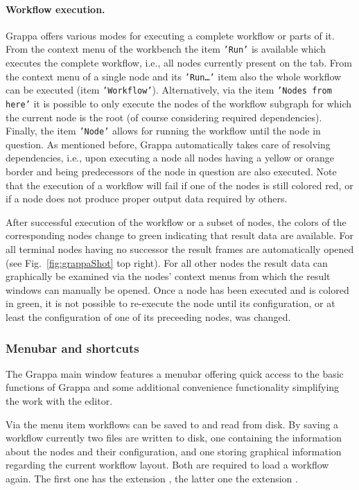 \paragraph{Workflow execution.} Grappa offers various modes for executing a
complete workflow or parts of it.
From the context menu of the workbench the item 
{\tt 'Run'} is available which executes the complete workflow, i.e., all nodes
currently present on the tab. From the context menu of a single node and its {\tt 'Run\ldots'} item also the whole workflow can be executed (item {\tt 'Workflow'}).
Alternatively, via the item {\tt 'Nodes from here'} it is possible to only execute the nodes of the workflow subgraph for which the 
current node is the root (of course considering required dependencies). Finally, the item {\tt 'Node'} allows for running the workflow
until the node in question. As mentioned before, Grappa automatically takes care
of resolving dependencies, i.e., upon executing a node all nodes having a yellow
or orange border and being predecessors of the node in question are also executed. Note that the execution of a workflow will fail if one of the nodes is still colored red, or if a node does not produce proper output data required by others. 

After successful execution of the workflow or a subset of nodes, the colors of
the corresponding nodes change to green indicating that result data are
available. For all terminal nodes having no successor the result frames are
automatically opened (see Fig.~\ref{fig:grappaShot} top right).
For all other nodes the result data can graphically be examined via the nodes'
context menus from which the result windows can manually be opened. 
Once a node has been executed and is colored in green, it is not possible to
re-execute the node until its configuration, or at least the configuration of
one of its preceeding nodes, was changed.

\subsubsection{Menubar and shortcuts} The Grappa main window features a menubar offering quick
access to the basic functions of Grappa and some additional convenience functionality simplifying
the work with the editor. 

Via the menu item  workflows can be saved to and read from
disk. By saving a workflow currently two files are written to disk, one containing the information
about the nodes and their configuration, and one storing graphical information
regarding the current workflow layout. Both are required to load a workflow
again. The first one has the extension , the latter one the
extension .

